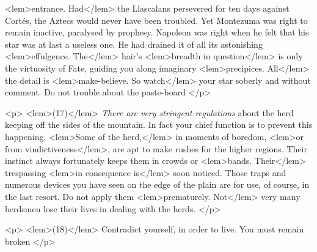 {{<lem>entrance. Had</lem> 
					{}
				the Llascalans persevered for ten days against Cort\'es, the Aztecs 
				would never have been troubled. Yet Montezuma was right to remain inactive, paralysed 
				by prophesy. Napoleon was right when he felt that his star was at last a useless one. 
				He had drained it of all its astonishing 
<lem>effulgence. The</lem> 
					{}
				hair's 
<lem>breadth in question</lem> 
					{}
				is only the virtuosity of Fate, guiding you along imaginary 
<lem>precipices. All</lem> 
					{}
				the detail 
				is 
<lem>make-believe. So watch</lem> 
					{}
				your star soberly and without comment. Do not trouble 
				about the paste-board  
					{}
 				</p> 

				<p>
				\vspace{10pt}
				\noindent
<lem>(17)</lem>{}\hspace{20pt} \emph{There are very stringent regulations} 
				about the herd keeping off the sides of the 
				mountain. In fact your chief function is to prevent this happening. 
<lem>Some of the herd,</lem> 
					{}
				in moments of boredom, 
<lem>or from vindictiveness</lem>{}, 
				are apt to make rushes for the higher 
				regions. Their instinct always fortunately keeps them in crowds or 
<lem>bands. Their</lem> 
					{}
				trespassing 
<lem>in consequence is</lem> 
					{}
				soon noticed. Those traps and numerous devices you have  
				seen on the edge of the plain are for use, of course, in the last resort. Do not apply 
				them 
<lem>prematurely. Not</lem> 
					{}
				very many herdsmen lose their lives in dealing with the herds. 
 				</p> 

				<p>
				\vspace{10pt}
				\noindent
<lem>(18)</lem>{}\hspace{20pt} Contradict yourself, in order to live. You must remain broken 
					{}
 				</p> 

}}
